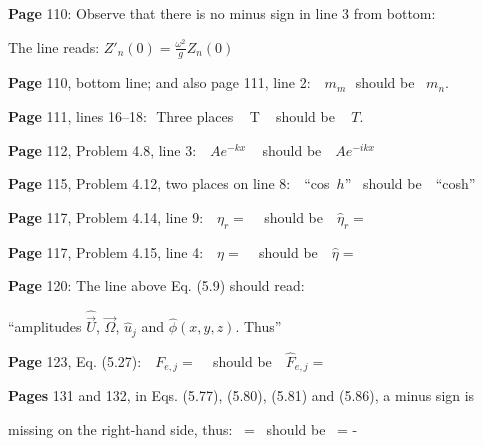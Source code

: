 \documentclass[a4paper,12pt]{article}
\begin{document}
\noindent %
{\bf Page} 110: Observe that there is no minus sign in line 3 from bottom: 

The line reads: $Z'_n(0) = \frac{\omega^2}{g}Z_n (0)$ %
\vspace{0.2cm}

\noindent %
{\bf Page} 110, bottom line; and also page 111, line 2: \,\, $m_m$\,\, should be  \, $m_n$. %
\vspace{0.2cm}

\noindent %
{\bf Page} 111, lines 16--18: \,\,Three places \,\,\, T \,\,\, should be \,\,\,  $T$. %
\vspace{0.2cm}

\noindent %
{\bf Page} 112, Problem 4.8, line 3: \,\,  $Ae^{-kx}$ \,\,\, should be \,\, $Ae^{-ikx}$ %
\vspace{0.2cm}

\noindent %
{\bf Page} 115, Problem 4.12, two places on line 8: \,\,  ``cos\ $h$''\,\,\, should be \,\, ``cosh'' %
\vspace{0.2cm}
\vspace{-0.4cm}

\noindent %
{\bf Page} 117, Problem 4.14, line 9: \,\,  $\eta _r =$ \,\,\, should be \,\, $\hat{\eta}_r =$ %
\vspace{0.2cm}

\noindent %
{\bf Page} 117, Problem 4.15, line 4: \,\, $\eta=$ \,\,\, should be \,\, $\hat{\eta}=$ %
\vspace{0.2cm}

\noindent %
{\bf Page} 120: The line above Eq. (5.9) should read: \,\,  

``amplitudes $\hat{\vec{U}}$, $\hat{\vec{\Omega}}$, $\hat{u}_j$ and $\hat{\phi}(x,y,z)$. Thus''
\vspace{0.2cm}

\noindent %
{\bf Page} 123, Eq. (5.27): \,\,  $F_{e,j}=$ \,\,\, should be \,\, $\hat{F}_{e,j}=$ %
\vspace{0.2cm}

\noindent %
{\bf Pages} 131 and 132, in Eqs. (5.77), (5.80), (5.81) and (5.86), a minus sign is 

missing on the right-hand side, thus: \, = \, should be \, = -  %
\vspace{0.2cm}
\end{document}
